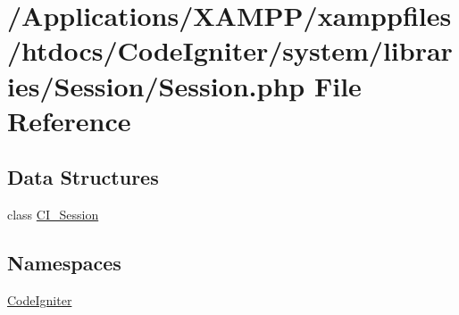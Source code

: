 \hypertarget{_session_8php}{}\section{/\+Applications/\+X\+A\+M\+P\+P/xamppfiles/htdocs/\+Code\+Igniter/system/libraries/\+Session/\+Session.php File Reference}
\label{_session_8php}
\subsection*{Data Structures}
\begin{DoxyCompactItemize}
\item 
class \mbox{\hyperlink{class_c_i___session}{C\+I\+\_\+\+Session}}
\end{DoxyCompactItemize}
\subsection*{Namespaces}
\begin{DoxyCompactItemize}
\item 
 \mbox{\hyperlink{namespace_code_igniter}{Code\+Igniter}}
\end{DoxyCompactItemize}
